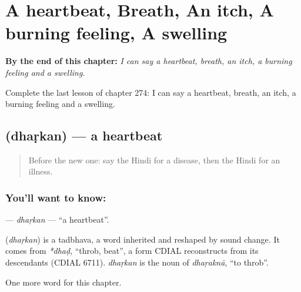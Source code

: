 
\chapter{A heartbeat, Breath, An itch, A burning feeling, A swelling}
\label{ch:hi-a-heartbeat-breath-an-itch-a-burning-feeling-a-swelling}

\begin{chapteropening}
\textbf{By the end of this chapter:} \emph{I can say a heartbeat, breath, an itch, a burning feeling and a swelling.}

Complete the last lesson of chapter 274: I can say a heartbeat, breath, an itch, a burning feeling and a swelling.
\end{chapteropening}

\section[\texorpdfstring{\hi{धड़कन} (dhaṛkan)}{धड़कन (dhaṛkan)}]{ (dhaṛkan) — a heartbeat}

\label{lesson:HI-C274-dharkan}



\begin{quote}
Before the new one: say the Hindi for a disease, then the Hindi for an illness.
\end{quote}

\subsection*{You'll want to know: }
\textbf{} — \emph{dhaṛkan} — \textquotedblleft{}a heartbeat\textquotedblright{}.

\begin{cousinweb}
\textbf{} (\emph{dhaṛkan}) is a tadbhava, a word inherited and reshaped by sound change. It comes from \emph{*dhaḍ}, \textquotedblleft{}throb, beat\textquotedblright{}, a form CDIAL reconstructs from its descendants (CDIAL 6711). \emph{dhaṛkan} is the noun of \emph{dhaṛaknā}, \textquotedblleft{}to throb\textquotedblright{}.
\end{cousinweb}

\begin{grammarlens}[title={What you've built}]
One more word for this chapter.
\end{grammarlens}

